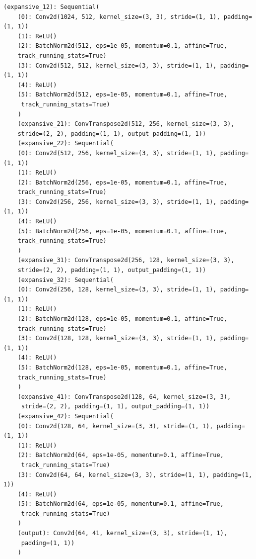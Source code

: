 \begin{lstlisting}[caption={Unet GP model architecture description},label=lst:unetgp]
	(expansive_12): Sequential(
	(0): Conv2d(1024, 512, kernel_size=(3, 3), stride=(1, 1), padding=(1, 1))
	(1): ReLU()
	(2): BatchNorm2d(512, eps=1e-05, momentum=0.1, affine=True, 
	track_running_stats=True)
	(3): Conv2d(512, 512, kernel_size=(3, 3), stride=(1, 1), padding=(1, 1))
	(4): ReLU()
	(5): BatchNorm2d(512, eps=1e-05, momentum=0.1, affine=True,
	 track_running_stats=True)
	)
	(expansive_21): ConvTranspose2d(512, 256, kernel_size=(3, 3), 
	stride=(2, 2), padding=(1, 1), output_padding=(1, 1))
	(expansive_22): Sequential(
	(0): Conv2d(512, 256, kernel_size=(3, 3), stride=(1, 1), padding=(1, 1))
	(1): ReLU()
	(2): BatchNorm2d(256, eps=1e-05, momentum=0.1, affine=True, 
	track_running_stats=True)
	(3): Conv2d(256, 256, kernel_size=(3, 3), stride=(1, 1), padding=(1, 1))
	(4): ReLU()
	(5): BatchNorm2d(256, eps=1e-05, momentum=0.1, affine=True, 
	track_running_stats=True)
	)
	(expansive_31): ConvTranspose2d(256, 128, kernel_size=(3, 3), 
	stride=(2, 2), padding=(1, 1), output_padding=(1, 1))
	(expansive_32): Sequential(
	(0): Conv2d(256, 128, kernel_size=(3, 3), stride=(1, 1), padding=(1, 1))
	(1): ReLU()
	(2): BatchNorm2d(128, eps=1e-05, momentum=0.1, affine=True, 
	track_running_stats=True)
	(3): Conv2d(128, 128, kernel_size=(3, 3), stride=(1, 1), padding=(1, 1))
	(4): ReLU()
	(5): BatchNorm2d(128, eps=1e-05, momentum=0.1, affine=True, 
	track_running_stats=True)
	)
	(expansive_41): ConvTranspose2d(128, 64, kernel_size=(3, 3),
	 stride=(2, 2), padding=(1, 1), output_padding=(1, 1))
	(expansive_42): Sequential(
	(0): Conv2d(128, 64, kernel_size=(3, 3), stride=(1, 1), padding=(1, 1))
	(1): ReLU()
	(2): BatchNorm2d(64, eps=1e-05, momentum=0.1, affine=True,
	 track_running_stats=True)
	(3): Conv2d(64, 64, kernel_size=(3, 3), stride=(1, 1), padding=(1, 1))
	(4): ReLU()
	(5): BatchNorm2d(64, eps=1e-05, momentum=0.1, affine=True,
	 track_running_stats=True)
	)
	(output): Conv2d(64, 41, kernel_size=(3, 3), stride=(1, 1),
	 padding=(1, 1))
	)
	
	\end{lstlisting}

